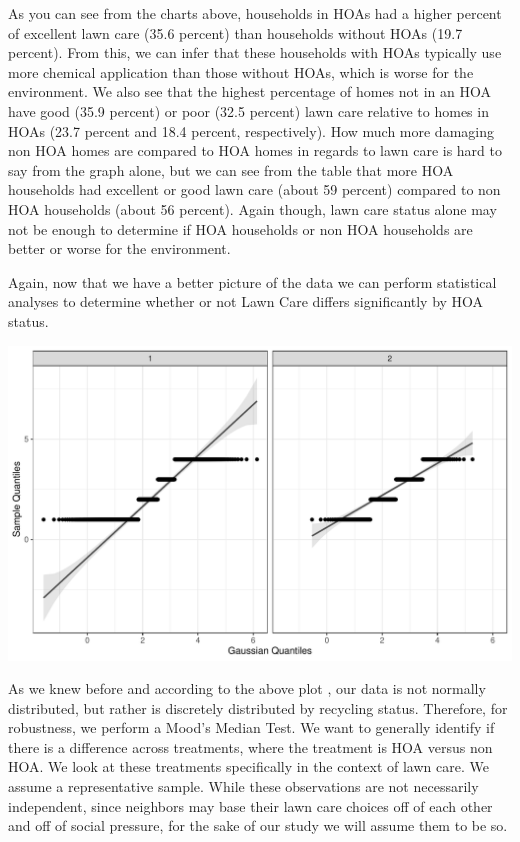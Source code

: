 \documentclass{article}
\begin{document}
As you can see from the charts above, households in HOAs had a higher percent of excellent lawn care (35.6 percent) than households without HOAs (19.7 percent). From this, we can infer that these households with HOAs typically use more chemical application than those without HOAs, which is worse for the environment. We also see that the highest percentage of homes not in an HOA have good (35.9 percent) or poor (32.5 percent) lawn care relative to homes in HOAs (23.7 percent and 18.4 percent, respectively). How much more damaging non HOA homes are compared to HOA homes in regards to lawn care is hard to say from the graph alone, but we can see from the table that more HOA households had excellent or good lawn care (about 59 percent) compared to non HOA households (about 56 percent). Again though, lawn care status alone may not be enough to determine if HOA households or non HOA households are better or worse for the environment. 

Again, now that we have a better picture of the data we can perform statistical analyses to determine whether or not Lawn Care differs significantly by HOA status. 

\includegraphics{part2-015}

As we knew before and according to the above plot \citep{qqplotr}, our data is not normally distributed, but rather is discretely distributed by recycling status. Therefore, for robustness, we perform a Mood's Median Test. We want to generally identify if there is a difference across treatments, where the treatment is HOA versus non HOA. We look at these treatments specifically in the context of lawn care. We assume a representative sample. While these observations are not necessarily independent, since neighbors may base their lawn care choices off of each other and off of social pressure, for the sake of our study we will assume them to be so.
\end{document}
